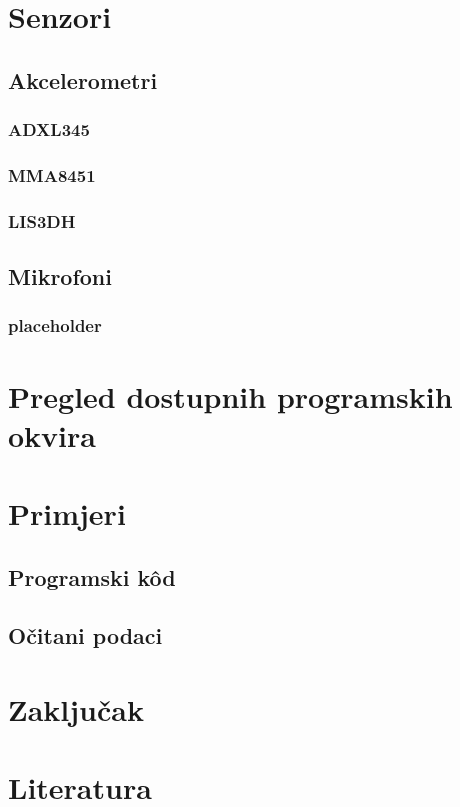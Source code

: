 \documentclass[12pt,a4paper]{article}
\begin{document}
\newpage


\section{Senzori}
	\subsection{Akcelerometri}
		\subsubsection{ADXL345}
		\subsubsection{MMA8451}
		\subsubsection{LIS3DH}

	\subsection{Mikrofoni}
		\subsubsection{placeholder}
\newpage
\section{Pregled dostupnih programskih okvira}

\newpage
\section{Primjeri}
	\subsection{Programski kôd}
	\subsection{Očitani podaci}

\newpage
\section{Zaključak}

\newpage
\section{Literatura}
\end{document}
